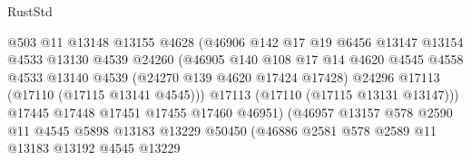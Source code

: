 \begin{lexlean}{RustStd}
\begin{coremodule}
                                    @503
                                    @11
                                    @13148
                                    @13155
                                    @4628
                                    (@46906
                                      @142
                                      @17
                                      @19
                                      @6456
                                      @13147
                                      @13154
                                      @4533
                                      @13130
                                      @4539
                                      @24260
                                      (@46905
                                        @140
                                        @108
                                        @17
                                        @14
                                        @4620
                                        @4545
                                        @4558
                                        @4533
                                        @13140
                                        @4539
                                        (@24270 @139 @4620 @17424 @17428)
                                        @24296
                                        @17113
                                        (@17110 (@17115 @13141 @4545)))
                                      @17113
                                      (@17110 (@17115 @13131 @13147)))
                                    @17445
                                    @17448
                                    @17451
                                    @17455
                                    @17460
                                    @46951)
                                  (@46957
                                    @13157
                                    @578
                                    @2590
                                    @11
                                    @4545
                                    @5898
                                    @13183
                                    @13229
                                    @50450
                                    (@46886
                                      @2581
                                      @578
                                      @2589
                                      @11
                                      @13183
                                      @13192
                                      @4545
                                      @13229

\end{coremodule}
\end{lexlean}
